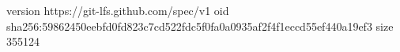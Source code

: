 version https://git-lfs.github.com/spec/v1
oid sha256:59862450eebfd0fd823c7cd522fdc5f0fa0a0935af2f4f1eccd55ef440a19ef3
size 355124
